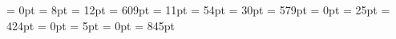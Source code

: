 \usepackage{graphicx}                %
\usepackage[spanish]{babel}   		 %
\usepackage{times}          		 %
\usepackage[T1]{fontenc}      		 %
\usepackage[utf8]{inputenc}			 %
\usepackage{amsmath} 				 %
\usepackage{fancyhdr}				 %
\usepackage{ifpdf}					 %
\usepackage{titlesec}				 %
\hoffset = 0pt
\oddsidemargin = 8pt
\headheight = 12pt
\textheight = 609pt
\marginparsep = 11pt
\marginparwidth = 54pt
\footskip = 30pt
\paperwidth = 579pt
\topmargin = 0pt
\headsep = 25pt
\textwidth = 424pt
\marginparwidth = 0pt
\marginparpush = 5pt
\voffset = 0pt
\paperheight = 845pt
\pagestyle{fancy}   				    %
\fancyhead[LE,RO]{\slshape \rightmark} \fancyhead[LO,RE]{\slshape \leftmark} \fancyfoot[C]{\thepage}
\linespread{1.5}  					    %
\parindent 1cm                          %
\parskip 7.2pt 							%

\renewcommand{\chaptermark}[1]{\markboth{\MakeUppercase
{\thechapter. #1}}{}}
\newcommand{\clearemptydoublepage}{\newpage{\pagestyle{empty}
\cleardoublepage}}
\newcommand{\HRule}{\rule{\linewidth}{0.5mm}}
